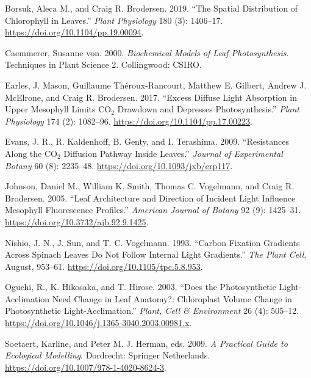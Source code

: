 \documentclass[
  letterpaper,
  DIV=11,
  numbers=noendperiod]{scrartcl}
\newlength{\cslhangindent}
\newlength{\cslentryspacingunit} %
\newenvironment{CSLReferences}[2] %
 {%
  \setlength{\parindent}{0pt}
  \ifodd #1
  \let\oldpar\par
  \def\par{\hangindent=\cslhangindent\oldpar}
  \fi
  \setlength{\parskip}{#2\cslentryspacingunit}
 }%
 {}
\begin{document}
\hypertarget{refs}{}
\begin{CSLReferences}{1}{0}
\leavevmode{}%
Borsuk, Aleca M., and Craig R. Brodersen. 2019. {``The Spatial
Distribution of Chlorophyll in Leaves.''} \emph{Plant Physiology} 180
(3): 1406--17. \url{https://doi.org/10.1104/pp.19.00094}.

\leavevmode{}%
Caemmerer, Susanne von. 2000. \emph{Biochemical Models of Leaf
Photosynthesis}. Techniques in Plant Science 2. Collingwood: CSIRO.

\leavevmode{}%
Earles, J. Mason, Guillaume Théroux-Rancourt, Matthew E. Gilbert, Andrew
J. McElrone, and Craig R. Brodersen. 2017. {``Excess Diffuse Light
Absorption in Upper Mesophyll Limits {CO}\(_{\textrm{2}}\) Drawdown and
Depresses Photosynthesis.''} \emph{Plant Physiology} 174 (2): 1082--96.
\url{https://doi.org/10.1104/pp.17.00223}.

\leavevmode{}%
Evans, J. R., R. Kaldenhoff, B. Genty, and I. Terashima. 2009.
{``Resistances Along the {CO}\(_{\textrm{2}}\) Diffusion Pathway Inside
Leaves.''} \emph{Journal of Experimental Botany} 60 (8): 2235--48.
\url{https://doi.org/10.1093/jxb/erp117}.

\leavevmode{}%
Johnson, Daniel M., William K. Smith, Thomas C. Vogelmann, and Craig R.
Brodersen. 2005. {``Leaf Architecture and Direction of Incident Light
Influence Mesophyll Fluorescence Profiles.''} \emph{American Journal of
Botany} 92 (9): 1425--31. \url{https://doi.org/10.3732/ajb.92.9.1425}.

\leavevmode{}%
Nishio, J. N., J. Sun, and T. C. Vogelmann. 1993. {``Carbon {Fixation}
{Gradients} Across {Spinach} {Leaves} {Do} {Not} {Follow} {Internal}
{Light} {Gradients}.''} \emph{The Plant Cell}, August, 953--61.
\url{https://doi.org/10.1105/tpc.5.8.953}.

\leavevmode{}%
Oguchi, R., K. Hikosaka, and T. Hirose. 2003. {``Does the Photosynthetic
Light-Acclimation Need Change in Leaf Anatomy?: {Chloroplast} Volume
Change in Photosynthetic Light-Acclimation.''} \emph{Plant, Cell \&
Environment} 26 (4): 505--12.
\url{https://doi.org/10.1046/j.1365-3040.2003.00981.x}.

\leavevmode{}%
Soetaert, Karline, and Peter M. J. Herman, eds. 2009. \emph{A
{Practical} {Guide} to {Ecological} {Modelling}}. Dordrecht: Springer
Netherlands. \url{https://doi.org/10.1007/978-1-4020-8624-3}.


\end{CSLReferences}
\end{document}
